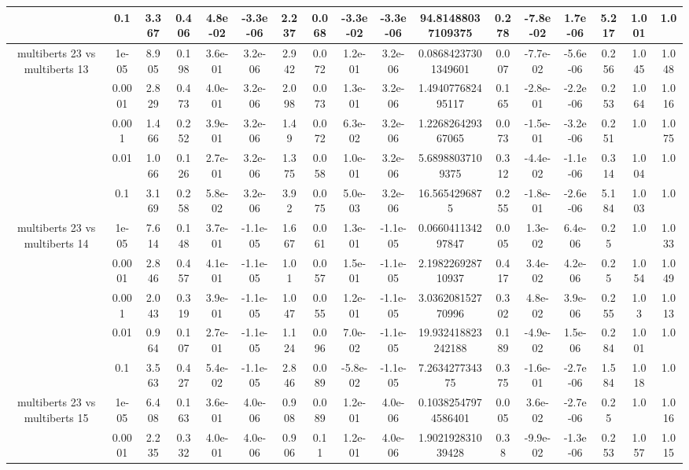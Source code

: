 \begin{tabular}{|c|c|c|c|c|c|c|c|c|c|c|c|c|c|c|c|c|}
 & 0.1 & 3.367 & 0.406 & 4.8e-02 & -3.3e-06 & 2.237 & 0.068 & -3.3e-02 & -3.3e-06 & 94.81488037109375 & 0.278 & -7.8e-02 & 1.7e-06 & 5.217 & 1.001 & 1.0 \\
\hline
\multirow{5}{*}{multiberts 23 vs multiberts 13} & 1e-05 & 8.905 & 0.198 & 3.6e-01 & 3.2e-06 & 2.942 & 0.072 & 1.2e-01 & 3.2e-06 & 0.08684237301349601 & 0.007 & -7.7e-02 & -5.6e-06 & 0.256 & 1.045 & 1.048 \\
 & 0.0001 & 2.829 & 0.473 & 4.0e-01 & 3.2e-06 & 2.098 & 0.073 & 1.3e-01 & 3.2e-06 & 1.494077682495117 & 0.165 & -2.8e-01 & -2.2e-06 & 0.253 & 1.064 & 1.016 \\
 & 0.001 & 1.466 & 0.252 & 3.9e-01 & 3.2e-06 & 1.49 & 0.072 & 6.3e-02 & 3.2e-06 & 1.226826429367065 & 0.073 & -1.5e-01 & -3.2e-06 & 0.251 & 1.0 & 1.075 \\
 & 0.01 & 1.066 & 0.126 & 2.7e-01 & 3.2e-06 & 1.375 & 0.058 & 1.0e-01 & 3.2e-06 & 5.68988037109375 & 0.312 & -4.4e-02 & -1.1e-06 & 0.314 & 1.004 & 1.0 \\
 & 0.1 & 3.169 & 0.258 & 5.8e-02 & 3.2e-06 & 3.92 & 0.075 & 5.0e-03 & 3.2e-06 & 16.5654296875 & 0.255 & -1.8e-01 & -2.6e-06 & 5.184 & 1.003 & 1.0 \\
\hline
\multirow{5}{*}{multiberts 23 vs multiberts 14} & 1e-05 & 7.614 & 0.148 & 3.7e-01 & -1.1e-05 & 1.667 & 0.061 & 1.3e-01 & -1.1e-05 & 0.066041134297847 & 0.005 & 1.3e-02 & 6.4e-06 & 0.25 & 1.0 & 1.033 \\
 & 0.0001 & 2.846 & 0.457 & 4.1e-01 & -1.1e-05 & 1.01 & 0.057 & 1.5e-01 & -1.1e-05 & 2.198226928710937 & 0.417 & 3.4e-02 & 4.2e-06 & 0.25 & 1.054 & 1.049 \\
 & 0.001 & 2.043 & 0.319 & 3.9e-01 & -1.1e-05 & 1.047 & 0.055 & 1.2e-01 & -1.1e-05 & 3.036208152770996 & 0.302 & 4.8e-02 & 3.9e-06 & 0.255 & 1.03 & 1.013 \\
 & 0.01 & 0.964 & 0.107 & 2.7e-01 & -1.1e-05 & 1.124 & 0.096 & 7.0e-02 & -1.1e-05 & 19.932418823242188 & 0.189 & -4.9e-02 & 1.5e-06 & 0.284 & 1.001 & 1.0 \\
 & 0.1 & 3.563 & 0.427 & 5.4e-02 & -1.1e-05 & 2.846 & 0.089 & -5.8e-02 & -1.1e-05 & 7.263427734375 & 0.375 & -1.6e-01 & -2.7e-06 & 1.584 & 1.018 & 1.0 \\
\hline
\multirow{5}{*}{multiberts 23 vs multiberts 15} & 1e-05 & 6.408 & 0.163 & 3.6e-01 & 4.0e-06 & 0.908 & 0.089 & 1.2e-01 & 4.0e-06 & 0.10382547974586401 & 0.005 & 3.6e-02 & -2.7e-06 & 0.25 & 1.0 & 1.016 \\
 & 0.0001 & 2.235 & 0.332 & 4.0e-01 & 4.0e-06 & 0.906 & 0.11 & 1.2e-01 & 4.0e-06 & 1.902192831039428 & 0.38 & -9.9e-02 & -1.3e-06 & 0.253 & 1.057 & 1.015 \\

\end{tabular}
